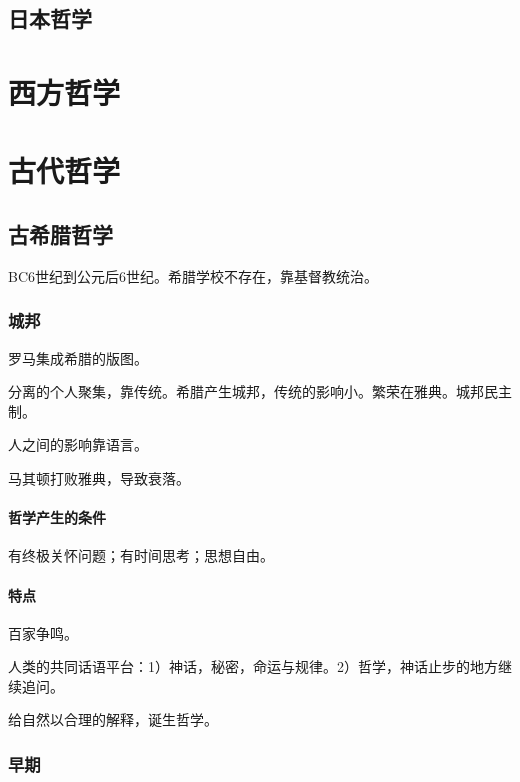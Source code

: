 \documentclass[UTF8]{../RepresentationUniverse}
\begin{document}
        \subsection{日本哲学}


    \section{西方哲学}



    \section{古代哲学}

        \subsection{古希腊哲学}
        BC6世纪到公元后6世纪。希腊学校不存在，靠基督教统治。

        \subsubsection{城邦}

        罗马集成希腊的版图。

        分离的个人聚集，靠传统。希腊产生城邦，传统的影响小。繁荣在雅典。城邦民主制。

        人之间的影响靠语言。

        马其顿打败雅典，导致衰落。


        \paragraph{哲学产生的条件}
    
        有终极关怀问题；有时间思考；思想自由。

        \paragraph{特点}

        百家争鸣。

        人类的共同话语平台：1）神话，秘密，命运与规律。2）哲学，神话止步的地方继续追问。

        给自然以合理的解释，诞生哲学。


        \subsubsection{早期}
\end{document}
